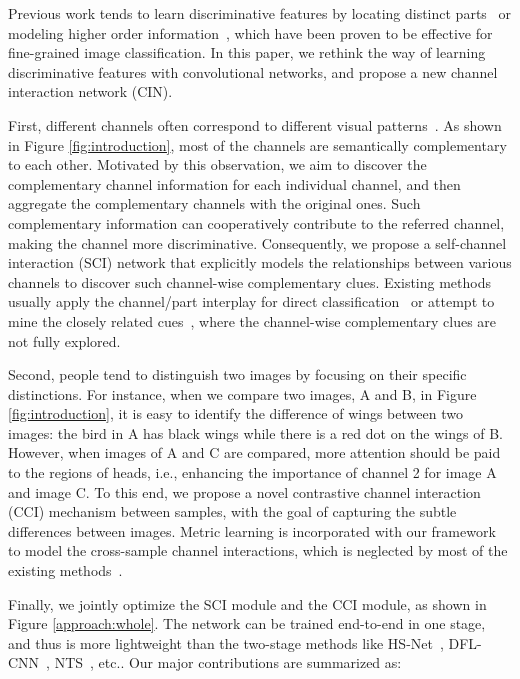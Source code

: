 \documentclass[letterpaper]{article} \usepackage{aaai20}  \usepackage{times}  \usepackage{helvet} \usepackage{courier}  \usepackage[hyphens]{url}  \usepackage{graphicx} \urlstyle{rm} \def\UrlFont{\rm}  \usepackage{graphicx}  \frenchspacing  \setlength{\pdfpagewidth}{8.5in}  \setlength{\pdfpageheight}{11in}  \usepackage{amsmath,amssymb}
\begin{document}
Previous work tends to learn discriminative features by locating distinct parts~\cite{DBLP:conf/nips/JaderbergSZK15,fu2017look,yang2018learning} or modeling higher order information~\cite{lin2015bilinear,DBLP:conf/cvpr/GaoBZD16,DBLP:conf/cvpr/KongF17,yu2018hierarchical}, which have been proven to be effective for fine-grained image classification.
In this paper, we rethink the way of learning discriminative features with convolutional networks, and propose a new channel interaction network (CIN).

First, different channels often correspond to different visual patterns~\cite{yosinski2015understanding}. As shown in Figure \ref{fig:introduction}, most of the channels are semantically complementary to each other. Motivated by this observation, we aim to discover the complementary channel information for each individual channel, and then aggregate the complementary channels with the original ones. Such complementary information can cooperatively contribute to the referred channel, making the channel more discriminative. Consequently, we propose a self-channel interaction (SCI) network that explicitly models the relationships between various channels to discover such channel-wise complementary clues.
Existing methods usually apply the channel/part interplay for direct classification~\cite{lin2015bilinear,yu2018hierarchical} or attempt to mine the closely related cues~\cite{DBLP:journals/corr/abs-1711-07971,yue2018compact}, where the channel-wise complementary clues are not fully explored.

Second, people tend to distinguish two images by focusing on their specific distinctions. For instance, when we compare two images, A and B, in Figure \ref{fig:introduction}, it is easy to identify the difference of wings between two images: the bird in A has black wings while there is  a red dot on the wings of B.
However, when images of A and C are compared, more attention should be paid to the regions of heads, i.e., enhancing the importance of channel 2 for image A and image C. To this end, we propose a novel contrastive channel interaction (CCI) mechanism between samples, with the goal of capturing the subtle differences between images. Metric learning is incorporated with our framework to model the cross-sample channel interactions, which is neglected by most of the existing methods~\cite{wang2018learning,yang2018learning}.

Finally, we jointly optimize the SCI module and the CCI module, as shown in Figure \ref{approach:whole}. The network can be trained end-to-end in one stage, and thus is more lightweight than the two-stage methods like HS-Net~\cite{lam2017fine}, DFL-CNN~\cite{wang2018learning}, NTS~\cite{yang2018learning}, etc..
Our major contributions are summarized as:
\end{document}
